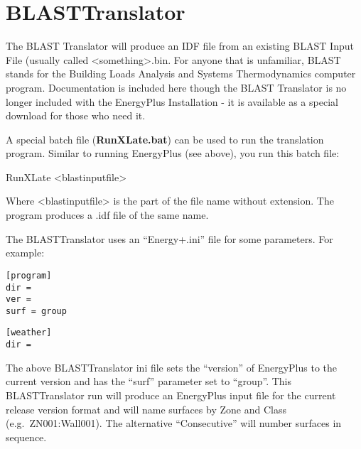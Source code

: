 \chapter{BLASTTranslator}\label{blasttranslator}

The BLAST Translator will produce an IDF file from an existing BLAST Input File (usually called \textless{}something\textgreater{}.bin. For anyone that is unfamiliar, BLAST stands for the Building Loads Analysis and Systems Thermodynamics computer program. Documentation is included here though the BLAST Translator is no longer included with the EnergyPlus Installation - it is available as a special download for those who need it.

A special batch file (\textbf{RunXLate.bat}) can be used to run the translation program. Similar to running EnergyPlus (see above), you run this batch file:

RunXLate \textless{}blastinputfile\textgreater{}

Where \textless{}blastinputfile\textgreater{} is the part of the file name without extension. The program produces a .idf file of the same name.

The BLASTTranslator uses an ``Energy+.ini'' file for some parameters. For example:

\begin{lstlisting}
[program]
dir =
ver =
surf = group
\end{lstlisting}

\begin{lstlisting}
[weather]
dir =
\end{lstlisting}

The above BLASTTranslator ini file sets the ``version'' of EnergyPlus to the current version and has the ``surf'' parameter set to ``group''. This BLASTTranslator run will produce an EnergyPlus input file for the current release version format and will name surfaces by Zone and Class (e.g.~ZN001:Wall001). The alternative ``Consecutive'' will number surfaces in sequence.
